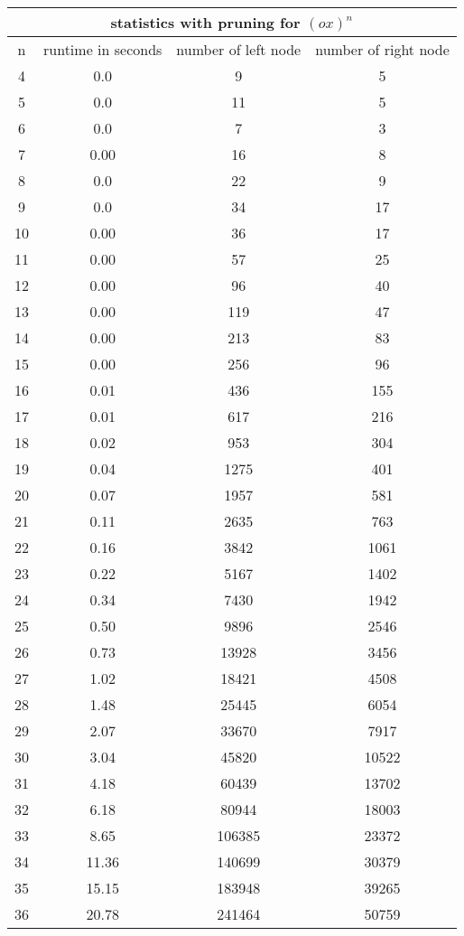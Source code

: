 \begin{tabular}{|c|c|c|c|} \hline 
\multicolumn{4}{|c|}{statistics with pruning for $(ox)^n$}\\ \hline
n & runtime in seconds & number of left node & number of right node\\ \hline
4 & 0.0 & 9 & 5\\ \hline
5 & 0.0 & 11 & 5\\ \hline
6 & 0.0 & 7 & 3\\ \hline
7 & 0.00 & 16 & 8\\ \hline
8 & 0.0 & 22 & 9\\ \hline
9 & 0.0 & 34 & 17\\ \hline
10 & 0.00 & 36 & 17\\ \hline
11 & 0.00 & 57 & 25\\ \hline
12 & 0.00 & 96 & 40\\ \hline
13 & 0.00 & 119 & 47\\ \hline
14 & 0.00 & 213 & 83\\ \hline
15 & 0.00 & 256 & 96\\ \hline
16 & 0.01 & 436 & 155\\ \hline
17 & 0.01 & 617 & 216\\ \hline
18 & 0.02 & 953 & 304\\ \hline
19 & 0.04 & 1275 & 401\\ \hline
20 & 0.07 & 1957 & 581\\ \hline
21 & 0.11 & 2635 & 763\\ \hline
22 & 0.16 & 3842 & 1061\\ \hline
23 & 0.22 & 5167 & 1402\\ \hline
24 & 0.34 & 7430 & 1942\\ \hline
25 & 0.50 & 9896 & 2546\\ \hline
26 & 0.73 & 13928 & 3456\\ \hline
27 & 1.02 & 18421 & 4508\\ \hline
28 & 1.48 & 25445 & 6054\\ \hline
29 & 2.07 & 33670 & 7917\\ \hline
30 & 3.04 & 45820 & 10522\\ \hline
31 & 4.18 & 60439 & 13702\\ \hline
32 & 6.18 & 80944 & 18003\\ \hline
33 & 8.65 & 106385 & 23372\\ \hline
34 & 11.36 & 140699 & 30379\\ \hline
35 & 15.15 & 183948 & 39265\\ \hline
36 & 20.78 & 241464 & 50759\\ \hline

\end{tabular}
